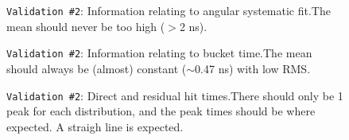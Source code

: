 \documentclass[12pt]{article}
\begin{document}
\begin{figure}
\centering
\noindent{}
  \caption{\centering \texttt{Validation \#2}: Information relating to angular systematic fit.\hspace{\textwidth}The mean should never be too high ($>$2 ns).}
  \label{fig:val21}
\end{figure}

\begin{figure}
\centering
\noindent{}
  \caption{\centering \texttt{Validation \#2}: Information relating to bucket time.\hspace{\textwidth}The mean should always be (almost) constant ($\sim$0.47 ns) with low RMS. }
  \label{fig:val22}
\end{figure}

\begin{figure}
\centering
\noindent{}
  \caption{\centering \texttt{Validation \#2}: Direct and residual hit times.\hspace{\textwidth}There should only be 1 peak for each distribution, and the peak times should be where expected. A straigh line is expected. }
  \label{fig:val23}
\end{figure}
\end{document}
